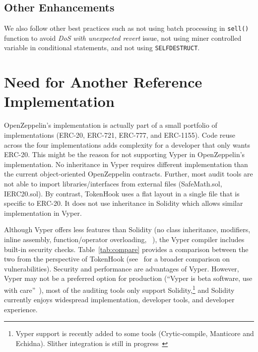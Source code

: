 \subsection*{Other Enhancements} We also follow other best practices such as not using batch processing in \texttt{sell()} function to avoid \textit{DoS with unexpected revert} issue, not using miner controlled variable in conditional statements, and not using \texttt{SELFDESTRUCT}.

\section{Need for Another Reference Implementation}
OpenZeppelin's implementation is actually part of a small portfolio of implementations (ERC-20, ERC-721, ERC-777, and ERC-1155). Code reuse across the four implementations adds complexity for a developer that only wants ERC-20. This might be the reason for not supporting Vyper in OpenZeppelin's implementation. No inheritance in Vyper requires different implementation than the current object-oriented OpenZeppelin contracts. Further, most audit tools are not able to import libraries/interfaces from external files (\eg SafeMath.sol, IERC20.sol). By contrast, TokenHook uses a flat layout in a single file that is specific to ERC-20. It does not use inheritance in Solidity which allows similar implementation in Vyper.


Although Vyper offers less features than Solidity (\eg no class inheritance, modifiers, inline assembly, function/operator overloading, \etc~\cite{SolidityDoc}), the Vyper compiler includes built-in security checks. Table~\ref{tab:compare} provides a comparison between the two from the perspective of TokenHook (see~\cite{Vyper1} for a broader comparison on vulnerabilities). Security and performance are advantages of Vyper. However, Vyper may not be a preferred option for production (``Vyper is beta software, use with care''~\cite{VyperReadme}), most of the auditing tools only support Solidity,\footnote{Vyper support is recently added to some tools (\eg Crytic-compile, Manticore and Echidna). Slither integration is still in progress~\cite{Crytic}} and Solidity currently enjoys widespread implementation, developer tools, and developer experience.

